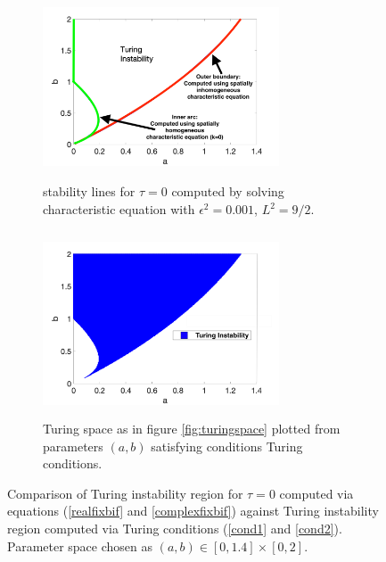 \begin{figure}[H]
    \centering
    \begin{subfigure}[t]{0.47\textwidth}
        \centering
        \includegraphics[width=7cm,height = 5.5cm]{bif0.png}
        \caption{stability lines for $\tau=0$ computed by solving characteristic equation with $\epsilon^2=0.001$, $L^2=9/2$.}
        \label{fig:bif0}
    \end{subfigure}
    \hfill
    \begin{subfigure}[t]{0.47\textwidth}
        \centering
        \includegraphics[width=7cm,height = 5.5cm]{turingspace.png}
        \caption{Turing space as in figure \ref{fig:turingspace} plotted from parameters $(a,b)$ satisfying conditions Turing conditions.}
        \label{}
    \end{subfigure}
    \caption{Comparison of Turing instability region for $\tau=0$ computed via equations (\eqref{realfixbif} and \eqref{complexfixbif}) against Turing instability region computed via Turing conditions (\eqref{cond1} and \eqref{cond2}). Parameter space chosen as $(a,b)\in[0,1.4]\times[0,2]$.}
    \label{fig:tspace1}
\end{figure}

